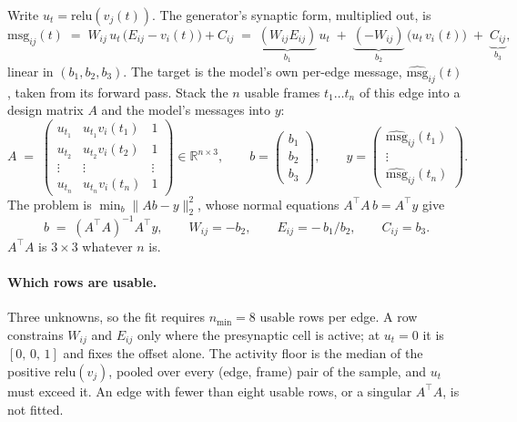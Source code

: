 \documentclass[11pt,a4paper]{article}
\newcommand{\vj}{v_j}
\newcommand{\vi}{v_i}
\newcommand{\Wij}{W_{ij}}
\newcommand{\Eij}{E_{ij}}
\newcommand{\msg}{\mathrm{msg}}
\newcommand{\act}{\mathrm{relu}}
\begin{document}
Write $u_t = \act(\vj(t))$. The generator's synaptic form, multiplied out, is
%
\begin{equation}
\msg_{ij}(t) \;=\; \Wij\,u_t\,\bigl(\Eij - \vi(t)\bigr) + C_{ij}
  \;=\; \underbrace{(\Wij \Eij)}_{b_1}\,u_t
  \;+\; \underbrace{(-\Wij)}_{b_2}\,\bigl(u_t\,\vi(t)\bigr)
  \;+\; \underbrace{C_{ij}}_{b_3},
\label{eq:edgelin}
\end{equation}
%
linear in $(b_1,b_2,b_3)$. The target is the model's own per-edge message,
$\widehat{\msg}_{ij}(t)$, taken from its forward pass. Stack
the $n$ usable frames $t_1 \dots t_n$ of this edge into a design matrix $A$ and
the model's messages into $y$:
%
\begin{equation}
A \;=\;
\begin{pmatrix}
u_{t_1} & u_{t_1}\vi(t_1) & 1\\
u_{t_2} & u_{t_2}\vi(t_2) & 1\\
\vdots  & \vdots          & \vdots\\
u_{t_n} & u_{t_n}\vi(t_n) & 1
\end{pmatrix}
\in \mathbb{R}^{n\times 3},
\qquad
b = \begin{pmatrix} b_1\\ b_2\\ b_3\end{pmatrix},
\qquad
y = \begin{pmatrix}
\widehat{\msg}_{ij}(t_1)\\ \vdots\\ \widehat{\msg}_{ij}(t_n)
\end{pmatrix}.
\label{eq:design}
\end{equation}
%
The problem is $\min_b \lVert A b - y\rVert_2^2$, whose normal equations
$A^{\!\top}\!A\,b = A^{\!\top}y$ give
%
\begin{equation}
b \;=\; (A^{\!\top}\! A)^{-1} A^{\!\top} y ,
\qquad
\Wij = -b_2 , \qquad \Eij = -\,b_1/b_2 , \qquad C_{ij} = b_3 .
\label{eq:edgesolve}
\end{equation}
%
$A^{\!\top}\!A$ is $3\times3$ whatever $n$ is.

\paragraph{Which rows are usable.} Three unknowns, so the fit requires
$n_{\min} = 8$ usable rows per edge. A row constrains $\Wij$ and $\Eij$ only where
the presynaptic cell is active; at $u_t = 0$ it is $[0,\,0,\,1]$ and fixes the
offset alone. The activity floor is the median of the positive $\act(\vj)$, pooled
over every (edge, frame) pair of the sample, and $u_t$ must exceed it. An edge
with fewer than eight usable rows, or a singular $A^{\!\top}\!A$, is not fitted.
\end{document}
